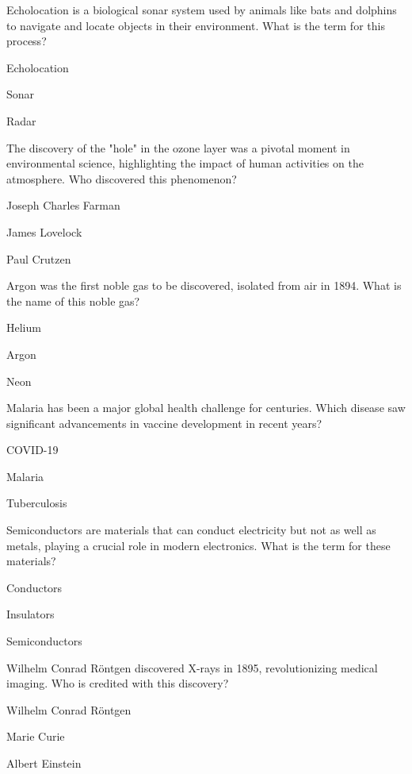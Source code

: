 \begin{enhancedmcq}{Echolocation is a biological sonar system used by animals like bats and dolphins to navigate and locate objects in their environment. What is the term for this process?}
\item Echolocation
\item Sonar
\item Radar

\end{enhancedmcq}
\begin{enhancedmcq}{The discovery of the "hole" in the ozone layer was a pivotal moment in environmental science, highlighting the impact of human activities on the atmosphere. Who discovered this phenomenon?}
\item Joseph Charles Farman
\item James Lovelock
\item Paul Crutzen

\end{enhancedmcq}
\begin{enhancedmcq}{Argon was the first noble gas to be discovered, isolated from air in 1894. What is the name of this noble gas?}
\item Helium
\item Argon
\item Neon

\end{enhancedmcq}
\begin{enhancedmcq}{Malaria has been a major global health challenge for centuries. Which disease saw significant advancements in vaccine development in recent years?}
\item COVID-19
\item Malaria
\item Tuberculosis

\end{enhancedmcq}
\begin{enhancedmcq}{Semiconductors are materials that can conduct electricity but not as well as metals, playing a crucial role in modern electronics. What is the term for these materials?}
\item Conductors
\item Insulators
\item Semiconductors

\end{enhancedmcq}
\begin{enhancedmcq}{Wilhelm Conrad Röntgen discovered X-rays in 1895, revolutionizing medical imaging. Who is credited with this discovery?}
\item Wilhelm Conrad Röntgen
\item Marie Curie
\item Albert Einstein

\end{enhancedmcq}
